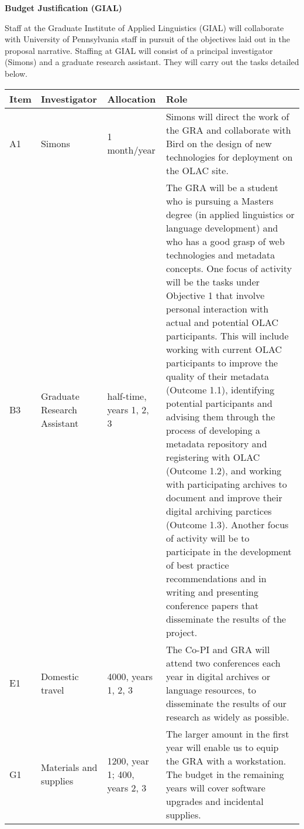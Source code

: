 \documentclass[11pt]{nsf}
\begin{document}
\begin{center}\textbf{\Large
Budget Justification (GIAL)
}\end{center}

Staff at the Graduate Institute of Applied Linguistics (GIAL) will
collaborate with University of Pennsylvania staff in pursuit of the
objectives laid out in the proposal narrative.
Staffing at GIAL will consist of a principal investigator (Simons)
and a graduate research assistant.  They will carry out the tasks
detailed below.

\vspace{1ex}

{\small\noindent
\begin{tabular}{lllp{3in}}
\textbf{Item} &
\textbf{Investigator} & \textbf{Allocation} & \textbf{Role} \\ \hline

A1 & Simons & 1 month/year &
Simons will direct the work of the GRA and collaborate with Bird
on the design of new technologies for deployment on the OLAC site.\\

B3 & Graduate Research Assistant & half-time, years 1, 2, 3 &
The GRA will be a student who is pursuing a Masters degree (in 
applied linguistics or language development) and who has a good grasp of web technologies and
metadata concepts. One focus of activity will be
the tasks under Objective 1 that involve personal interaction
with actual and potential OLAC participants.  This will include
working with current OLAC participants to improve the quality of their
metadata (Outcome 1.1), identifying potential participants and advising
them through the process of developing a metadata repository and registering with
OLAC (Outcome 1.2), and working with participating archives to document
and improve their digital archiving parctices (Outcome 1.3). 
Another focus of activity will be to participate
in the development of best practice recommendations and in
writing and presenting conference papers 
that disseminate the results of the project.\\

E1 & Domestic travel & 4000, years 1, 2, 3 &
The Co-PI and GRA will attend two conferences each year in digital archives or
language resources, to disseminate the results of our research as
widely as possible.\\

G1 & Materials and supplies & 1200, year 1; 400, years 2, 3 &
The larger amount in the first year will enable us
to equip the GRA with a workstation.  The budget in the remaining years
will cover software upgrades and incidental supplies.\\

\end{tabular}}
\end{document}
